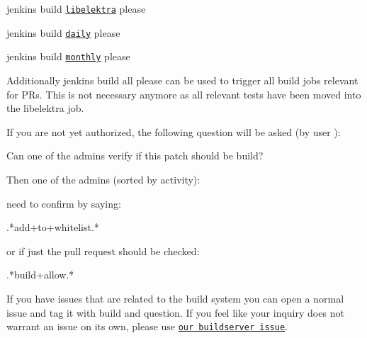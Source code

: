 \begin{DoxyItemize}
\item jenkins build \href{https://build.libelektra.org/job/libelektra/}{\tt libelektra} please
\item jenkins build \href{https://build.libelektra.org/job/libelektra-daily/}{\tt daily} please
\item jenkins build \href{https://build.libelektra.org/job/libelektra-monthly/}{\tt monthly} please
\end{DoxyItemize}

Additionally {\ttfamily jenkins build all please} can be used to trigger all build jobs relevant for PR\textquotesingle{}s. This is not necessary anymore as all relevant tests have been moved into the libelektra job.

If you are not yet authorized, the following question will be asked (by user )\+: \begin{DoxyVerb}Can one of the admins verify if this patch should be build?
\end{DoxyVerb}


Then one of the admins (sorted by activity)\+:


\begin{DoxyItemize}
\item 
\item 
\item 
\item 
\item 
\item 
\end{DoxyItemize}

need to confirm by saying\+: \begin{DoxyVerb}.*add\W+to\W+whitelist.*
\end{DoxyVerb}


or if just the pull request should be checked\+: \begin{DoxyVerb}.*build\W+allow.*
\end{DoxyVerb}


If you have issues that are related to the build system you can open a normal issue and tag it with {\ttfamily build} and {\ttfamily question}. If you feel like your inquiry does not warrant an issue on its own, please use \href{https://issues.libelektra.org/160}{\tt our buildserver issue}. 